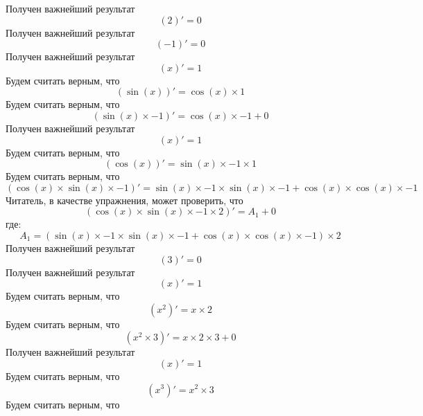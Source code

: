 \documentclass{article}
\begin{document}
Получен важнейший результат\newline
\[( 2 )' =  0 \]\newline
Получен важнейший результат\newline
\[( -1 )' =  0 \]\newline
Получен важнейший результат\newline
\[( x )' =  1 \]\newline
Будем считать верным, что\newline
\[(\sin( x ))' = \cos( x )\times 1 \]\newline
Будем считать верным, что\newline
\[(\sin( x )\times -1 )' = \cos( x )\times -1 + 0 \]\newline
Получен важнейший результат\newline
\[( x )' =  1 \]\newline
Будем считать верным, что\newline
\[(\cos( x ))' = \sin( x )\times -1 \times 1 \]\newline
Будем считать верным, что\newline
\[(\cos( x )\times\sin( x )\times -1 )' = \sin( x )\times -1 \times\sin( x )\times -1 +\cos( x )\times\cos( x )\times -1 \]\newline
Читатель, в качестве упражнения, может проверить, что\newline
\[(\cos( x )\times\sin( x )\times -1 \times 2 )' =  A_1 + 0 \]\newline
где:\[A_1 = (\sin( x )\times -1 \times\sin( x )\times -1 +\cos( x )\times\cos( x )\times -1 )\times 2 \]\newline
Получен важнейший результат\newline
\[( 3 )' =  0 \]\newline
Получен важнейший результат\newline
\[( x )' =  1 \]\newline
Будем считать верным, что\newline
\[( x ^{ 2 })' =  x \times 2 \]\newline
Будем считать верным, что\newline
\[( x ^{ 2 }\times 3 )' =  x \times 2 \times 3 + 0 \]\newline
Получен важнейший результат\newline
\[( x )' =  1 \]\newline
Будем считать верным, что\newline
\[( x ^{ 3 })' =  x ^{ 2 }\times 3 \]\newline
Будем считать верным, что\newline
\end{document}
